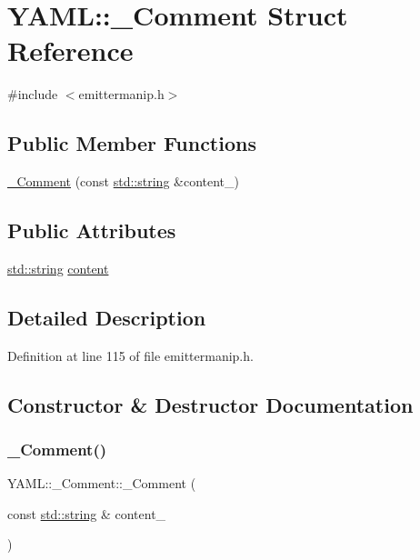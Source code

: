 \hypertarget{struct_y_a_m_l_1_1___comment}{}\section{Y\+A\+ML\+::\+\_\+\+Comment Struct Reference}
\label{struct_y_a_m_l_1_1___comment}


{\ttfamily \#include $<$emittermanip.\+h$>$}

\subsection*{Public Member Functions}
\begin{DoxyCompactItemize}
\item 
\mbox{\hyperlink{struct_y_a_m_l_1_1___comment_af7e4319ed3c6c98f871347dec31342ef}{\+\_\+\+Comment}} (const \mbox{\hyperlink{glad_8h_ac83513893df92266f79a515488701770}{std\+::string}} \&content\+\_\+)
\end{DoxyCompactItemize}
\subsection*{Public Attributes}
\begin{DoxyCompactItemize}
\item 
\mbox{\hyperlink{glad_8h_ac83513893df92266f79a515488701770}{std\+::string}} \mbox{\hyperlink{struct_y_a_m_l_1_1___comment_a001ad5bfc16a31e2fd69afe3477d2025}{content}}
\end{DoxyCompactItemize}


\subsection{Detailed Description}


Definition at line 115 of file emittermanip.\+h.



\subsection{Constructor \& Destructor Documentation}
\mbox{\label{struct_y_a_m_l_1_1___comment_af7e4319ed3c6c98f871347dec31342ef}} 
\subsubsection{\texorpdfstring{\_Comment()}{\_Comment()}}
{\footnotesize\ttfamily Y\+A\+M\+L\+::\+\_\+\+Comment\+::\+\_\+\+Comment (\begin{DoxyParamCaption}\item[{const \mbox{\hyperlink{glad_8h_ac83513893df92266f79a515488701770}{std\+::string}} \&}]{content\+\_\+ }\end{DoxyParamCaption})\hspace{0.3cm}{\ttfamily [inline]}}



